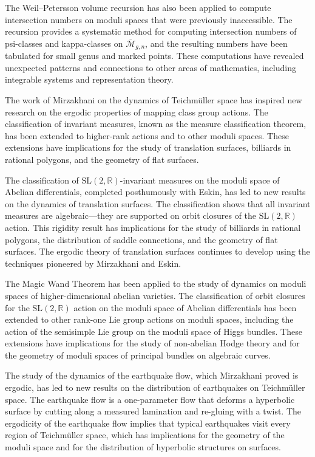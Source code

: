 The Weil--Petersson volume recursion has also been applied to compute intersection numbers on moduli spaces that were previously inaccessible. The recursion provides a systematic method for computing intersection numbers of psi-classes and kappa-classes on $\overline{\mathcal{M}}_{g,n}$, and the resulting numbers have been tabulated for small genus and marked points. These computations have revealed unexpected patterns and connections to other areas of mathematics, including integrable systems and representation theory.

The work of Mirzakhani on the dynamics of Teichm\"uller space has inspired new research on the ergodic properties of mapping class group actions. The classification of invariant measures, known as the measure classification theorem, has been extended to higher-rank actions and to other moduli spaces. These extensions have implications for the study of translation surfaces, billiards in rational polygons, and the geometry of flat surfaces.

The classification of $\mathrm{SL}(2,\mathbb{R})$-invariant measures on the moduli space of Abelian differentials, completed posthumously with Eskin, has led to new results on the dynamics of translation surfaces. The classification shows that all invariant measures are algebraic---they are supported on orbit closures of the $\mathrm{SL}(2,\mathbb{R})$ action. This rigidity result has implications for the study of billiards in rational polygons, the distribution of saddle connections, and the geometry of flat surfaces. The ergodic theory of translation surfaces continues to develop using the techniques pioneered by Mirzakhani and Eskin.

The Magic Wand Theorem has been applied to the study of dynamics on moduli spaces of higher-dimensional abelian varieties. The classification of orbit closures for the $\mathrm{SL}(2,\mathbb{R})$ action on the moduli space of Abelian differentials has been extended to other rank-one Lie group actions on moduli spaces, including the action of the semisimple Lie group on the moduli space of Higgs bundles. These extensions have implications for the study of non-abelian Hodge theory and for the geometry of moduli spaces of principal bundles on algebraic curves.

The study of the dynamics of the earthquake flow, which Mirzakhani proved is ergodic, has led to new results on the distribution of earthquakes on Teichm\"uller space. The earthquake flow is a one-parameter flow that deforms a hyperbolic surface by cutting along a measured lamination and re-gluing with a twist. The ergodicity of the earthquake flow implies that typical earthquakes visit every region of Teichm\"uller space, which has implications for the geometry of the moduli space and for the distribution of hyperbolic structures on surfaces.

